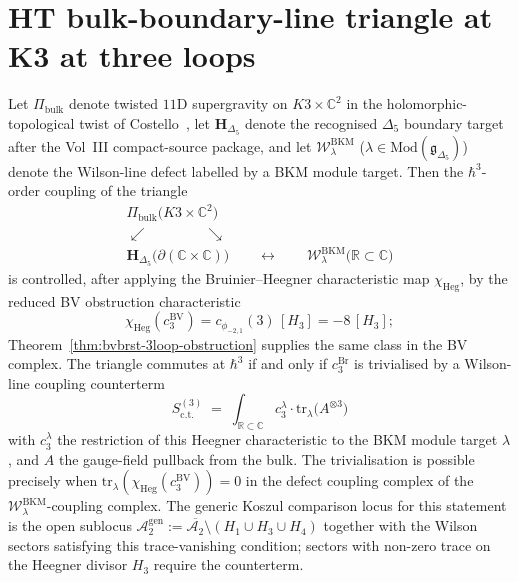 \section{HT bulk-boundary-line triangle at K3 at three loops}
\label{sec:htbb-core-3loop-triangle-K3}

\begin{theorem}
\label{thm:htbb-core-3loop-triangle}
Let $\Pi_{\mathrm{bulk}}$ denote twisted $11$D supergravity on
$K3\times\mathbb{C}^2$ in the holomorphic-topological twist of
Costello~\cite{Costello2017M5}, let
$\mathbf{H}_{\Delta_5}$ denote the recognised $\Delta_5$ boundary target
after the Vol~III compact-source package, and let
$\mathcal{W}^{\mathrm{BKM}}_\lambda$
($\lambda\in\mathrm{Mod}(\mathfrak{g}_{\Delta_5})$)
denote the Wilson-line defect labelled by a BKM module target. Then the
$\hbar^3$-order coupling of the triangle
\[
\begin{array}{c}
 \Pi_{\mathrm{bulk}}\bigl(K3\times\mathbb{C}^2\bigr) \\
 \swarrow \qquad\qquad \searrow \\
 \mathbf{H}_{\Delta_5}\bigl(\partial(\mathbb{C}\times\mathbb{C})\bigr)
 \qquad\longleftrightarrow\qquad
 \mathcal{W}^{\mathrm{BKM}}_\lambda\bigl(\mathbb{R}\subset\mathbb{C}\bigr)
\end{array}
\]
is controlled, after applying the Bruinier--Heegner characteristic map
\(\chi_{\mathrm{Heg}}\), by the reduced BV obstruction characteristic
\[
 \chi_{\mathrm{Heg}}(c^{\mathrm{BV}}_3)
 = c_{\phi_{-2,1}}(3)\,[H_3]
 = -8\,[H_3];
\]
Theorem~\ref{thm:bvbrst-3loop-obstruction} supplies the same class in
the BV complex. The triangle commutes
at $\hbar^3$ if and only if $c^{\mathrm{Br}}_3$ is trivialised by a Wilson-line
coupling counterterm
\[
 S^{(3)}_{\mathrm{c.t.}}
 \;=\;
 \int_{\mathbb{R}\subset\mathbb{C}}
 c_3^{\lambda}\cdot\mathrm{tr}_{\lambda}\bigl(A^{\otimes 3}\bigr)
\]
with $c_3^{\lambda}$ the restriction of this Heegner characteristic to
the BKM module target \(\lambda\), and $A$ the gauge-field pullback from the bulk. The
trivialisation is possible precisely when
$\mathrm{tr}_\lambda(\chi_{\mathrm{Heg}}(c^{\mathrm{BV}}_3)) = 0$ in
the defect coupling complex of the
$\mathcal{W}^{\mathrm{BKM}}_\lambda$-coupling
complex. The generic Koszul comparison locus for this statement is
the open sublocus
$\mathcal{A}_2^{\mathrm{gen}} :=
\overline{\mathcal{A}_2}\setminus(H_1\cup H_3\cup H_4)$ together with
the Wilson sectors satisfying this trace-vanishing condition; sectors
with non-zero trace on the Heegner divisor $H_3$ require the
counterterm.
\end{theorem}

